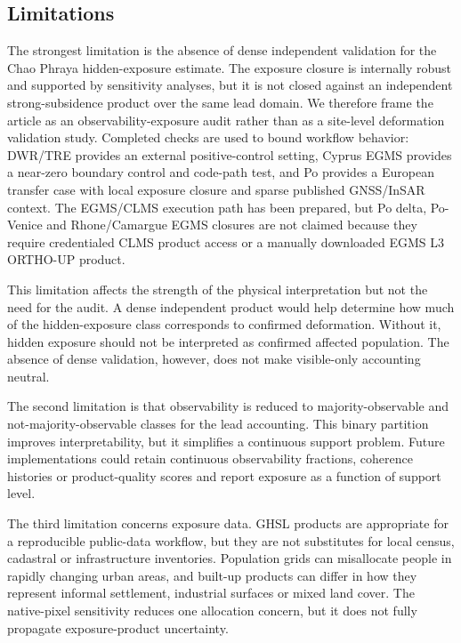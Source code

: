 \documentclass[pdflatex,sn-mathphys-ay]{sn-jnl}
\begin{document}
\subsection{Limitations}

The strongest limitation is the absence of dense independent validation for the Chao Phraya hidden-exposure estimate. The exposure closure is internally robust and supported by sensitivity analyses, but it is not closed against an independent strong-subsidence product over the same lead domain. We therefore frame the article as an observability-exposure audit rather than as a site-level deformation validation study. Completed checks are used to bound workflow behavior: DWR/TRE provides an external positive-control setting, Cyprus EGMS provides a near-zero boundary control and code-path test, and Po provides a European transfer case with local exposure closure and sparse published GNSS/InSAR context. The EGMS/CLMS execution path has been prepared, but Po delta, Po-Venice and Rhone/Camargue EGMS closures are not claimed because they require credentialed CLMS product access or a manually downloaded EGMS L3 ORTHO-UP product.

This limitation affects the strength of the physical interpretation but not the need for the audit. A dense independent product would help determine how much of the hidden-exposure class corresponds to confirmed deformation. Without it, hidden exposure should not be interpreted as confirmed affected population. The absence of dense validation, however, does not make visible-only accounting neutral.

The second limitation is that observability is reduced to majority-observable and not-majority-observable classes for the lead accounting. This binary partition improves interpretability, but it simplifies a continuous support problem. Future implementations could retain continuous observability fractions, coherence histories or product-quality scores and report exposure as a function of support level.

The third limitation concerns exposure data. GHSL products are appropriate for a reproducible public-data workflow, but they are not substitutes for local census, cadastral or infrastructure inventories. Population grids can misallocate people in rapidly changing urban areas, and built-up products can differ in how they represent informal settlement, industrial surfaces or mixed land cover. The native-pixel sensitivity reduces one allocation concern, but it does not fully propagate exposure-product uncertainty.
\end{document}
